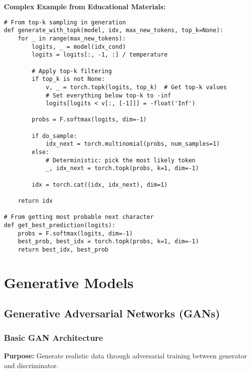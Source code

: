 \documentclass[11pt,a4paper]{book}
\begin{document}
\textbf{Complex Example from Educational Materials:}
\begin{verbatim}
# From top-k sampling in generation
def generate_with_topk(model, idx, max_new_tokens, top_k=None):
    for _ in range(max_new_tokens):
        logits, _ = model(idx_cond)
        logits = logits[:, -1, :] / temperature
        
        # Apply top-k filtering
        if top_k is not None:
            v, _ = torch.topk(logits, top_k)  # Get top-k values
            # Set everything below top-k to -inf
            logits[logits < v[:, [-1]]] = -float('Inf')
        
        probs = F.softmax(logits, dim=-1)
        
        if do_sample:
            idx_next = torch.multinomial(probs, num_samples=1)
        else:
            # Deterministic: pick the most likely token
            _, idx_next = torch.topk(probs, k=1, dim=-1)
        
        idx = torch.cat((idx, idx_next), dim=1)
    
    return idx

# From getting most probable next character
def get_best_prediction(logits):
    probs = F.softmax(logits, dim=-1)
    best_prob, best_idx = torch.topk(probs, k=1, dim=-1)
    return best_idx, best_prob
\end{verbatim}

\chapter{Generative Models}

\section{Generative Adversarial Networks (GANs)}

\subsection{Basic GAN Architecture}

\textbf{Purpose:} Generate realistic data through adversarial training between generator and discriminator.
\end{document}
